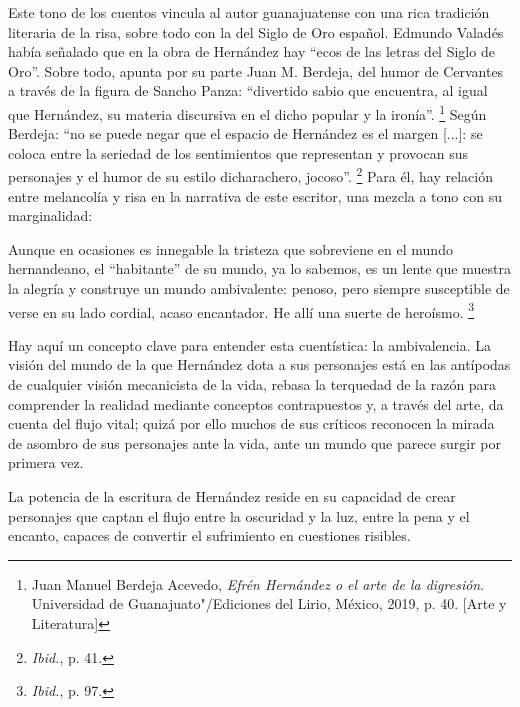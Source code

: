 \documentclass[14pt,twoside,final]{extbook} %
\let\oldfootnote\footnote
\renewcommand\footnote[1]{%
\oldfootnote{\hspace{1mm}#1}}
\begin{document}
Este tono de los cuentos vincula al autor guanajuatense con una rica tradición literaria de la risa, sobre todo con la del Siglo de Oro español. Edmundo Valadés había señalado que en la obra de Hernández hay ``ecos de las letras del Siglo de Oro''. Sobre todo, apunta por su parte Juan M. Berdeja, del humor de Cervantes a través de la figura de Sancho Panza: ``divertido sabio que encuentra, al igual que Hernández, su materia discursiva en el dicho popular y la ironía''.\footnote{Juan Manuel Berdeja Acevedo, \emph{Efrén Hernández o el arte de la digresión}. Universidad de Guanajuato"/Ediciones del Lirio, México, 2019, p. 40. [Arte y Literatura]} Según Berdeja: ``no se puede negar que el espacio de Hernández es el margen [...]: se coloca entre la seriedad de los sentimientos que representan y provocan sus personajes y el humor de su estilo dicharachero, jocoso''.\footnote{\emph{Ibid.}, p. 41.} Para él, hay relación entre melancolía y risa en la narrativa de este escritor, una mezcla a tono con su marginalidad:
\begin{quoting}
Aunque en ocasiones es innegable la tristeza que sobreviene en el mundo hernandeano, el ``habitante'' de su mundo, ya lo sabemos, es un lente que muestra la alegría y construye un mundo ambivalente: penoso, pero siempre susceptible de verse en su lado cordial, acaso encantador. He allí una suerte de heroísmo.\footnote{\emph{Ibid.}, p. 97.}
\end{quoting}
Hay aquí un concepto clave para entender esta cuentística: la ambivalencia. La visión del mundo de la que Hernández dota a sus personajes está en las antípodas de cualquier visión mecanicista de la vida, rebasa la terquedad de la razón para comprender la realidad mediante conceptos contrapuestos y, a través del arte, da cuenta del flujo vital; quizá por ello muchos de sus críticos reconocen la mirada de asombro de sus personajes ante la vida, ante un mundo que parece surgir por primera vez.

La potencia de la escritura de Hernández reside en su capacidad de crear personajes que captan el flujo entre la oscuridad y la luz, entre la pena y el encanto, capaces de convertir el sufrimiento en cuestiones risibles.
\end{document}
